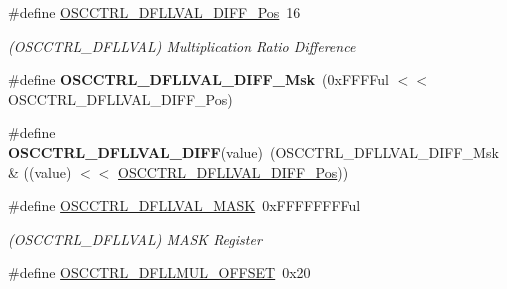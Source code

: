 \begin{DoxyCompactItemize}
\item 
\hypertarget{group___s_a_m_l21___o_s_c_c_t_r_l_ga3285312e7cb0b1dc1211b6e67bf9444d}{}\#define \hyperlink{group___s_a_m_l21___o_s_c_c_t_r_l_ga3285312e7cb0b1dc1211b6e67bf9444d}{O\+S\+C\+C\+T\+R\+L\+\_\+\+D\+F\+L\+L\+V\+A\+L\+\_\+\+D\+I\+F\+F\+\_\+\+Pos}~16\label{group___s_a_m_l21___o_s_c_c_t_r_l_ga3285312e7cb0b1dc1211b6e67bf9444d}

\begin{DoxyCompactList}\small\item\em (O\+S\+C\+C\+T\+R\+L\+\_\+\+D\+F\+L\+L\+V\+A\+L) Multiplication Ratio Difference \end{DoxyCompactList}\item 
\hypertarget{group___s_a_m_l21___o_s_c_c_t_r_l_ga139a69718a32439c6b8aa6ac26c03be2}{}\#define {\bfseries O\+S\+C\+C\+T\+R\+L\+\_\+\+D\+F\+L\+L\+V\+A\+L\+\_\+\+D\+I\+F\+F\+\_\+\+Msk}~(0x\+F\+F\+F\+Ful $<$$<$ O\+S\+C\+C\+T\+R\+L\+\_\+\+D\+F\+L\+L\+V\+A\+L\+\_\+\+D\+I\+F\+F\+\_\+\+Pos)\label{group___s_a_m_l21___o_s_c_c_t_r_l_ga139a69718a32439c6b8aa6ac26c03be2}

\item 
\hypertarget{group___s_a_m_l21___o_s_c_c_t_r_l_ga9ac23087a72a57b46739dd2ae78a2c9a}{}\#define {\bfseries O\+S\+C\+C\+T\+R\+L\+\_\+\+D\+F\+L\+L\+V\+A\+L\+\_\+\+D\+I\+F\+F}(value)~(O\+S\+C\+C\+T\+R\+L\+\_\+\+D\+F\+L\+L\+V\+A\+L\+\_\+\+D\+I\+F\+F\+\_\+\+Msk \& ((value) $<$$<$ \hyperlink{group___s_a_m_l21___o_s_c_c_t_r_l_ga3285312e7cb0b1dc1211b6e67bf9444d}{O\+S\+C\+C\+T\+R\+L\+\_\+\+D\+F\+L\+L\+V\+A\+L\+\_\+\+D\+I\+F\+F\+\_\+\+Pos}))\label{group___s_a_m_l21___o_s_c_c_t_r_l_ga9ac23087a72a57b46739dd2ae78a2c9a}

\item 
\hypertarget{group___s_a_m_l21___o_s_c_c_t_r_l_ga9f0663f26a54cc0857ad891963fd7d2e}{}\#define \hyperlink{group___s_a_m_l21___o_s_c_c_t_r_l_ga9f0663f26a54cc0857ad891963fd7d2e}{O\+S\+C\+C\+T\+R\+L\+\_\+\+D\+F\+L\+L\+V\+A\+L\+\_\+\+M\+A\+S\+K}~0x\+F\+F\+F\+F\+F\+F\+F\+Ful\label{group___s_a_m_l21___o_s_c_c_t_r_l_ga9f0663f26a54cc0857ad891963fd7d2e}

\begin{DoxyCompactList}\small\item\em (O\+S\+C\+C\+T\+R\+L\+\_\+\+D\+F\+L\+L\+V\+A\+L) M\+A\+S\+K Register \end{DoxyCompactList}\item 
\hypertarget{group___s_a_m_l21___o_s_c_c_t_r_l_gacbc7ecae09d7c5833c15e713518f6af0}{}\#define \hyperlink{group___s_a_m_l21___o_s_c_c_t_r_l_gacbc7ecae09d7c5833c15e713518f6af0}{O\+S\+C\+C\+T\+R\+L\+\_\+\+D\+F\+L\+L\+M\+U\+L\+\_\+\+O\+F\+F\+S\+E\+T}~0x20\label{group___s_a_m_l21___o_s_c_c_t_r_l_gacbc7ecae09d7c5833c15e713518f6af0}


\end{DoxyCompactItemize}
